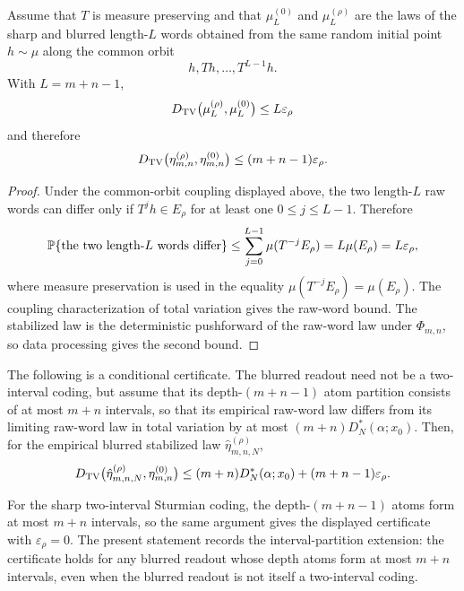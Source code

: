 \begin{proposition}\label{prop:boundary-layer}
Assume that $T$ is measure preserving and that
$\mu_L^{(0)}$ and $\mu_L^{(\rho)}$ are the laws of the sharp and blurred
length-$L$ words obtained from the same random initial point $h\sim\mu$ along
the common orbit
\[
h,Th,\ldots,T^{L-1}h .
\]
With $L=m+n-1$,
\[
D_{\mathrm{TV}}\bigl(\mu_L^{(\rho)},\mu_L^{(0)}\bigr)
\le L\varepsilon_\rho
\]
and therefore
\[
D_{\mathrm{TV}}\bigl(\eta_{m,n}^{(\rho)},\eta_{m,n}^{(0)}\bigr)
\le (m+n-1)\varepsilon_\rho .
\]
\end{proposition}

\begin{proof}
Under the common-orbit coupling displayed above, the two length-$L$ raw words
can differ only if $T^j h\in E_\rho$ for at least one $0\le j\le L-1$.
Therefore
\[
\mathbb{P}\{\text{the two length-}L\text{ words differ}\}
\le
\sum_{j=0}^{L-1}\mu(T^{-j}E_\rho)
=
L\mu(E_\rho)
=
L\varepsilon_\rho,
\]
where measure preservation is used in the equality
$\mu(T^{-j}E_\rho)=\mu(E_\rho)$. The coupling characterization of total
variation gives the raw-word bound. The stabilized law is the deterministic
pushforward of the raw-word law under $\Phi_{m,n}$, so data processing gives
the second bound.
\end{proof}

\begin{corollary}\label{cor:resolution-certificate}
The following is a conditional certificate. The blurred readout need not be a
two-interval coding, but assume that its depth-$(m+n-1)$ atom partition consists
of at most $m+n$ intervals, so that its empirical raw-word law differs from its
limiting raw-word law in total variation by at most
$(m+n)D_N^*(\alpha;x_0)$. Then, for the empirical blurred stabilized law
$\hat{\eta}_{m,n,N}^{(\rho)}$,
\[
D_{\mathrm{TV}}\bigl(\hat{\eta}_{m,n,N}^{(\rho)},\eta_{m,n}^{(0)}\bigr)
\le
(m+n)D_N^*(\alpha;x_0)+(m+n-1)\varepsilon_\rho.
\]
\end{corollary}

\begin{remark}
For the sharp two-interval Sturmian coding, the depth-$(m+n-1)$ atoms form at
most $m+n$ intervals, so the same argument gives the displayed certificate
with $\varepsilon_\rho=0$.  The present statement records the
interval-partition extension: the certificate holds for any blurred readout
whose depth atoms form at most $m+n$ intervals, even when the blurred readout
is not itself a two-interval coding.
\end{remark}

